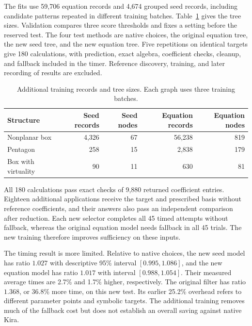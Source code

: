 The fits use 59,706 equation records and 4,674 grouped seed records, including candidate patterns repeated in different training batches. Table~\ref{tab:scattering-fit} gives the tree sizes. Validation compares three score thresholds and fixes a setting before the reserved test. The four test methods are native choices, the original equation tree, the new seed tree, and the new equation tree. Five repetitions on identical targets give 180 calculations, with prediction, exact algebra, coefficient checks, cleanup, and fallback included in the timer. Reference discovery, training, and later recording of results are excluded.

\begin{table}[!htbp]
\centering\small
\caption{Additional training records and tree sizes. Each graph uses three training batches.}
\label{tab:scattering-fit}
\begin{tabular}{@{}lrrrr@{}}\toprule
Structure & Seed records & Seed nodes & Equation records & Equation nodes\\\midrule
Nonplanar box & 4,326 & 67 & 56,238 & 819 \\
Pentagon & 258 & 15 & 2,838 & 179 \\
Box with virtuality & 90 & 11 & 630 & 81 \\
\bottomrule
\end{tabular}
\end{table}

All 180 calculations pass exact checks of 9,880 returned coefficient entries. Eighteen additional applications receive the target and prescribed basis without reference coefficients, and their answers also pass an independent comparison after reduction. Each new selector completes all 45 timed attempts without fallback, whereas the original equation model needs fallback in all 45 trials. The new training therefore improves sufficiency on these inputs.

The timing result is more limited. Relative to native choices, the new seed model has ratio $1.027$ with descriptive 95\% interval $[0.995,1.086]$, and the new equation model has ratio $1.017$ with interval $[0.988,1.054]$. Their measured average times are 2.7\% and 1.7\% higher, respectively. The original filter has ratio $1.368$, or 36.8\% more time, on this new test. Its earlier 25.2\% overhead refers to different parameter points and symbolic targets. The additional training removes much of the fallback cost but does not establish an overall saving against native Kira.

